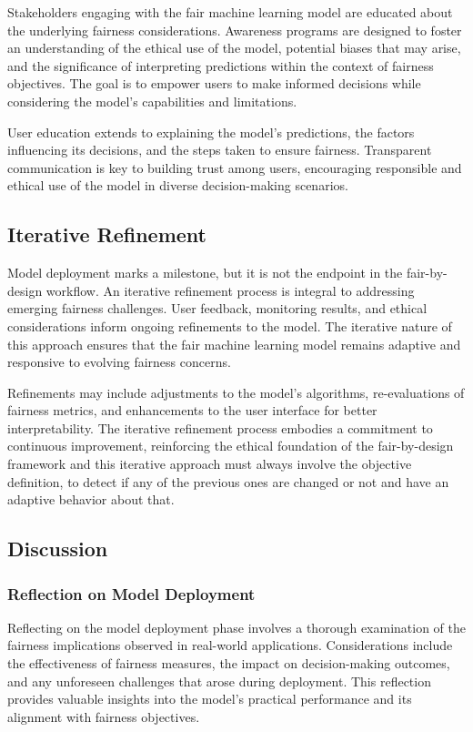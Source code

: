 Stakeholders engaging with the fair machine learning model are educated about the underlying fairness considerations. Awareness programs are designed to foster an understanding of the ethical use of the model, potential biases that may arise, and the significance of interpreting predictions within the context of fairness objectives. The goal is to empower users to make informed decisions while considering the model's capabilities and limitations.

User education extends to explaining the model's predictions, the factors influencing its decisions, and the steps taken to ensure fairness. Transparent communication is key to building trust among users, encouraging responsible and ethical use of the model in diverse decision-making scenarios.

\subsection{Iterative Refinement}

Model deployment marks a milestone, but it is not the endpoint in the fair-by-design workflow. An iterative refinement process is integral to addressing emerging fairness challenges. User feedback, monitoring results, and ethical considerations inform ongoing refinements to the model. The iterative nature of this approach ensures that the fair machine learning model remains adaptive and responsive to evolving fairness concerns.

Refinements may include adjustments to the model's algorithms, re-evaluations of fairness metrics, and enhancements to the user interface for better interpretability. The iterative refinement process embodies a commitment to continuous improvement, reinforcing the ethical foundation of the fair-by-design framework and this iterative approach must always involve the objective definition, to detect if any of the previous ones are changed or not and have an adaptive behavior about that.

\subsection{Discussion}

\subsubsection{Reflection on Model Deployment}

Reflecting on the model deployment phase involves a thorough examination of the fairness implications observed in real-world applications. Considerations include the effectiveness of fairness measures, the impact on decision-making outcomes, and any unforeseen challenges that arose during deployment. This reflection provides valuable insights into the model's practical performance and its alignment with fairness objectives.

